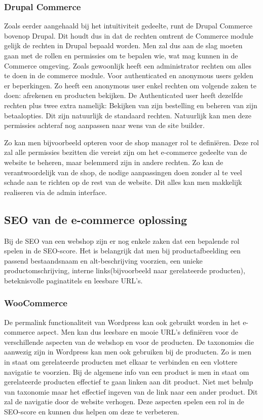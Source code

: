 \subsubsection{Drupal Commerce}
Zoals eerder aangehaald bij het intuïtiviteit gedeelte, runt de Drupal Commerce bovenop Drupal. Dit houdt dus in dat de rechten omtrent de Commerce module gelijk de rechten in Drupal bepaald worden. Men zal dus aan de slag moeten gaan met de rollen en permissies om te bepalen wie, wat mag kunnen in de Commerce omgeving. Zoals gewoonlijk heeft een administrator rechten om alles te doen in de commerce module. Voor authenticated en anonymous users gelden er beperkingen. Zo heeft een anonymous user enkel rechten om volgende zaken te doen: afrekenen en producten bekijken. De Authenticated user heeft dezelfde rechten plus twee extra namelijk: Bekijken van zijn bestelling en beheren van zijn betaalopties. Dit zijn natuurlijk de standaard rechten. Natuurlijk kan men deze permissies achteraf nog aanpassen naar wens van de site builder. 

Zo kan men bijvoorbeeld opteren voor de shop manager rol te definiëren. Deze rol zal alle permissies bezitten die vereist zijn om het e-commerce gedeelte van de website te beheren, maar belemmerd zijn in andere rechten. Zo kan de verantwoordelijk van de shop, de nodige aanpassingen doen zonder al te veel schade aan te richten op de rest van de website. Dit alles kan men makkelijk realiseren via de admin interface.
\subsection{SEO van de e-commerce oplossing}
Bij de SEO van een webshop zijn er nog enkele zaken dat een bepalende rol spelen in de SEO-score. Het is belangrijk dat men bij productafbeelding een passend bestaandsnaam en alt-beschrijving voorzien, een unieke productomschrijving, interne links(bijvoorbeeld naar gerelateerde producten), beteknisvolle paginatitels en leesbare URL's.
\subsubsection{WooCommerce}
De permalink functionaliteit van Wordpress kan ook gebruikt worden in het e-commerce aspect. Men kan dus leesbare en mooie URL's definiëren voor de verschillende aspecten van de webshop en voor de producten. De taxonomies die aanwezig zijn in Wordpress kan men ook gebruiken bij de producten. Zo is men in staat om gerelateerde producten met elkaar te verbinden en een vlottere navigatie te voorzien. Bij de algemene info van een product is men in staat om gerelateerde producten effectief te gaan linken aan dit product. Niet met behulp van taxonomie maar het effectief ingeven van de link naar een ander product. Dit zal de navigatie door de website verhogen. Deze aspecten spelen een rol in de SEO-score en kunnen dus helpen om deze te verbeteren.
